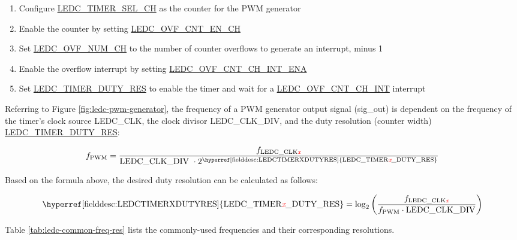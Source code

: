 \documentclass[main\_\_EN.tex]{subfiles}
\begin{document}
 \begin{enumerate}
    \item Configure \hyperref[fielddesc:LEDCTIMERSELCHN]{LEDC\_TIMER\_SEL\_CH} as the counter for the PWM generator
    \item Enable the counter by setting  \hyperref[fielddesc:LEDCOVFCNTENCHN]{LEDC\_OVF\_CNT\_EN\_CH}
    \item Set 
    \hyperref[fielddesc:LEDCOVFNUMCHN]{LEDC\_OVF\_NUM\_CH} to the number of counter overflows to generate an interrupt, minus 1
    \item Enable the overflow interrupt by setting \hyperref[fielddesc:LEDCOVFCNTCHNINTENA]{LEDC\_OVF\_CNT\_CH\_INT\_ENA}
    \item Set \hyperref[fielddesc:LEDCTIMERXDUTYRES]{LEDC\_TIMER\_DUTY\_RES} to enable the timer and 
    wait for a \hyperref[int:ledc-ovf-cnt]{LEDC\_OVF\_CNT\_CH\_INT} interrupt
\end{enumerate}

Referring to Figure \ref{fig:ledc-pwm-generator}, the frequency of a PWM generator output signal (sig\_out) is dependent on the frequency of the timer's clock source LEDC\_CLK, the clock divisor LEDC\_CLK\_DIV, and the duty resolution (counter width) \hyperref[fielddesc:LEDCTIMERXDUTYRES]{LEDC\_TIMER\_DUTY\_RES}:

    \[
    f_{\textrm{PWM}}=\frac{f_{\textrm{LEDC\_CLK\regindex{x}}}}
                        {\textrm{LEDC\_CLK\_DIV }\cdot 2^{\textrm{\hyperref[fielddesc:LEDCTIMERXDUTYRES]{LEDC\_TIMER\regindex{x}\_DUTY\_RES}}}}
    \]

Based on the formula above, the desired duty resolution can be calculated as follows:

    \[
    \textrm{\hyperref[fielddesc:LEDCTIMERXDUTYRES]{LEDC\_TIMER\regindex{x}\_DUTY\_RES}}
    =\log_2\left(\frac{f_{\textrm{LEDC\_CLK\regindex{x}}}}
    {f_{\textrm{PWM}}\cdot \textrm{LEDC\_CLK\_DIV}}\right)
    \]

Table \ref{tab:ledc-common-freq-res} lists the commonly-used frequencies and their corresponding resolutions.
\end{document}
